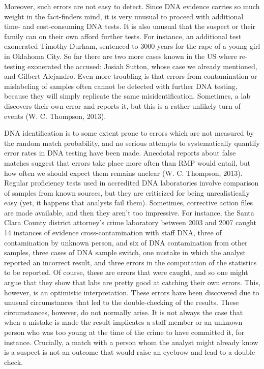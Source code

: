 \documentclass[
  10pt,
  dvipsnames,enabledeprecatedfontcommands]{scrartcl}
\begin{document}
Moreover, such errors are not easy to detect. Since DNA evidence carries
so much weight in the fact-finders mind, it is very unusual to proceed
with additional time- and cost-consuming DNA tests. It is also unusual
that the suspect or their family can on their own afford further tests.
For instance, an additional test exonerated Timothy Durham, sentenced to
3000 years for the rape of a young girl in Oklahoma City. So far there
are two more cases known in the US where re-testing exonerated the
accused: Josiah Sutton, whose case we already mentioned, and Gilbert
Alejandro. Even more troubling is that errors from contamination or
mislabeling of samples often cannot be detected with further DNA
testing, because they will simply replicate the same misidentification.
Sometimes, a lab discovers their own error and reports it, but this is a
rather unlikely turn of events (W. C. Thompson, 2013).

DNA identification is to some extent prone to errors which are not
measured by the random match probability, and no serious attempts to
systematically quantify error rates in DNA testing have been made.
Anecdotal reports about false matches suggest that errors take place
more often than RMP would entail, but how often we should expect them
remains unclear (W. C. Thompson, 2013). Regular proficiency tests used
in accredited DNA laboratories involve comparison of samples from known
sources, but they are criticized for being unrealistically easy (yet, it
happens that analysts fail them). Sometimes, corrective action files are
made available, and then they aren't too impressive. For instance, the
Santa Clara County district attorney's crime laboratory between 2003 and
2007 caught 14 instances of evidence cross-contamination with staff DNA,
three of contamination by unknown person, and six of DNA contamination
from other samples, three cases of DNA sample switch, one mistake in
which the analyst reported an incorrect result, and three errors in the
computation of the statistics to be reported. Of course, these are
errors that were caught, and so one might argue that they show that labs
are pretty good at catching their own errors. This, however, is an
optimistic interpretation. These errors have been discovered due to
unusual circumstances that led to the double-checking of the results.
These circumstances, however, do not normally arise. It is not always
the case that when a mistake is made the result implicates a staff
member or an unknown person who was too young at the time of the crime
to have committed it, for instance. Crucially, a match with a person
whom the analyst might already know is a suspect is not an outcome that
would raise an eyebrow and lead to a double-check.
\end{document}
